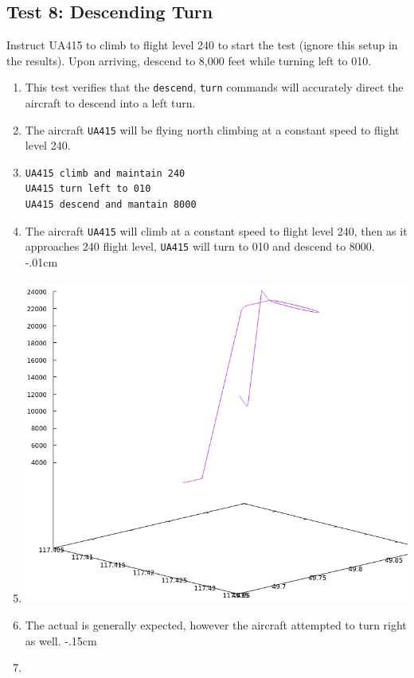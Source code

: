 \documentclass[letterpaper, 12pt]{article}
\begin{document}
\subsection{Test 8: Descending Turn}
Instruct UA415 to climb to flight level 240 to start the test (ignore this setup in the results). Upon arriving, descend to 8,000 feet while turning left to 010.
\begin{enumerate}\itemsep-.15cm
\item This test verifies that the \verb!descend!, \verb!turn! commands will accurately direct the aircraft to descend into a left turn.
\item The aircraft \verb!UA415! will be flying north climbing at a constant speed to flight level 240. 
\item \begin{verbatim}
UA415 climb and maintain 240
UA415 turn left to 010
UA415 descend and mantain 8000
\end{verbatim}
\item The aircraft \verb!UA415! will climb at a constant speed to flight level 240, then as it approaches 240 flight level, \verb!UA415! will turn to 010 and descend to 8000.
\itemsep-.01cm
\item \includegraphics[scale=.4,valign=t,center]{test8.png}
\item The actual is generally expected, however the aircraft attempted to turn right as well.
\itemsep-.15cm
\item 
\end{enumerate}
\end{document}
